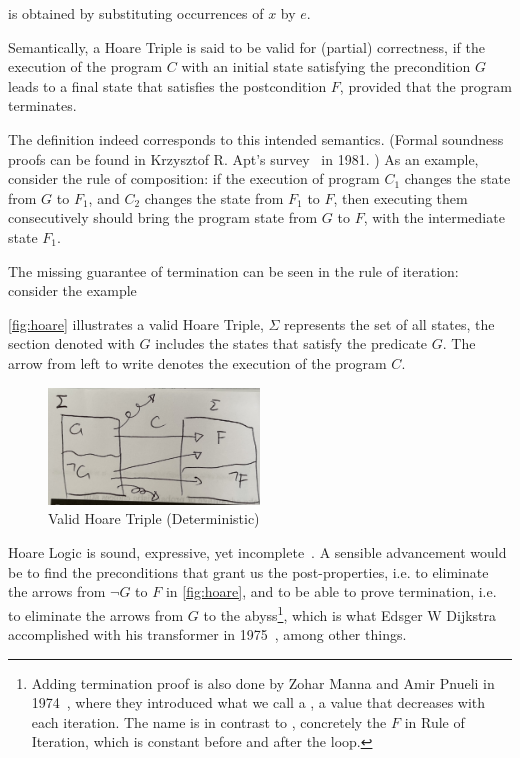  is obtained by substituting occurrences of $x$ by $e$. 

Semantically, a Hoare Triple {{}} is said to be valid for (partial) correctness, if the execution of the program $C$ with an initial state satisfying the precondition $G$ leads to a final state that satisfies the postcondition $F$, provided that the program terminates. 

The definition indeed corresponds to this intended semantics. (Formal soundness proofs can be found in Krzysztof R. Apt's survey~\cite{apt81} in 1981. )
As an example, consider the rule of composition: if the execution of program $C_1$ changes the state from $G$ to $F_1$, and $C_2$ changes the state from $F_1$ to $F$, then executing them consecutively should bring the program state from $G$ to $F$, with the intermediate state $F_1$.

The missing guarantee of termination can be seen in the rule of iteration: consider the example 

\autoref{fig:hoare} illustrates a valid Hoare Triple, $\Sigma$ represents the set of all states, the section denoted with $G$ includes the states that satisfy the predicate $G$. The arrow from left to write denotes the execution of the program $C$. 


\begin{figure}[ht!]\centering
\includegraphics[width=0.5\textwidth]{image/hoare.jpg}
\caption{Valid Hoare Triple (Deterministic)}
\label{fig:hoare}
\end{figure}


Hoare Logic is sound, expressive, yet incomplete~\cite{apt81}.
A sensible advancement would be to find the  preconditions that grant us the post-properties, i.e. to eliminate the arrows from $\neg G$ to $F$ in \autoref{fig:hoare}, and to be able to prove termination, i.e. to eliminate the arrows from $G$ to the abyss\footnote{Adding termination proof is also done by Zohar Manna and Amir Pnueli in 1974~\cite{manna74}, where they introduced what we call a , a value that decreases with each iteration. The name is in contrast to , concretely the $F$ in Rule of Iteration, which is constant before and after the loop. }, which is what Edsger W Dijkstra accomplished with his  transformer in 1975~\cite{dijkstra75}, among other things. 



